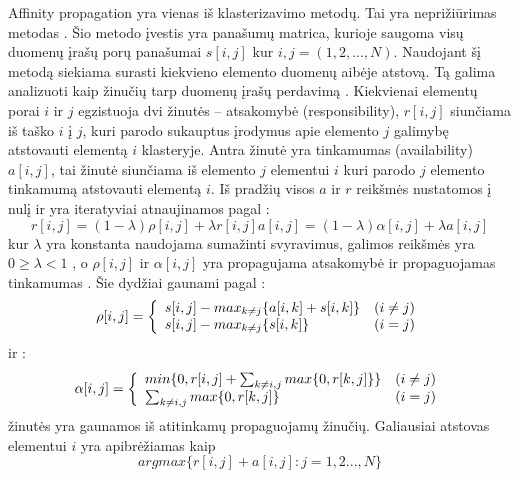 Affinity propagation yra vienas iš klasterizavimo metodų. Tai yra neprižiūrimas metodas \cite{comp}. Šio metodo įvestis yra panašumų matrica, kurioje saugoma visų duomenų įrašų porų panašumai $s[i, j]$ kur $i, j =  (1,  2, ..., N)$. Naudojant šį metodą siekiama surasti kiekvieno elemento duomenų aibėje atstovą. Tą galima analizuoti kaip žinučių tarp duomenų įrašų perdavimą \cite{fastprop}. Kiekvienai elementų porai $i$ ir $j$ egzistuoja dvi žinutės -- atsakomybė (responsibility), $r[i, j]$ siunčiama iš taško $i$ į $j$, kuri parodo sukauptus įrodymus apie elemento $j$ galimybę atstovauti elementą $i$ klasteryje.  Antra žinutė yra tinkamumas (availability) $a[i, j]$, tai žinutė siunčiama iš elemento $j$ elementui $i$ kuri parodo $j$ elemento tinkamumą atstovauti elementą $i$. Iš pradžių visos $a$ ir $r$ reikšmės nustatomos į nulį ir yra iteratyviai atnaujinamos pagal \cite{fastprop}:
 \begin{equation}
    r[i, j] = (1 - \lambda)\rho[i, j] + \lambda r[i, j]
    a[i, j] = (1 - \lambda)\alpha[i, j] + \lambda a[i, j]
 \end{equation}
 kur $\lambda$ yra konstanta naudojama sumažinti svyravimus, galimos reikšmės yra $ 0 \geq \lambda < 1 $ , o $\rho[i, j]$ ir  $\alpha[i, j]$ yra propagujama atsakomybė ir propaguojamas tinkamumas \cite{fastprop}. Šie dydžiai gaunami pagal \cite{fastprop}:
 \begin{equation}
   \rho[i, j]=\left\{
                  \begin{array}{l r}
                    s[i,j] - max_{k \neq j} \{ {a[i, k] + s[i, k]} \} & (i \neq j) \\
                    s[i,j] - max_{k \neq j} \{ {s[i, k]} \} & (i = j) \\
                  \end{array}
                \right.
 \end{equation}
   ir \cite{fastprop}:
\begin{equation}
    \alpha[i, j] =  \left\{
         \begin{array}{l r}
            min \{ 0, r[i, j] + \sum_{k \neq i,j} max \{ 0, r[k, j] \} \}         & (i \neq j) \\
            \sum_{k \neq i,j} max \{ 0, r[k, j] \}  & (i = j) \\
         \end{array}
       \right.
\end{equation}
žinutės yra gaunamos iš atitinkamų propaguojamų žinučių. Galiausiai atstovas elementui $i$ yra apibrėžiamas kaip \cite{fastprop}
\begin{equation}
    argmax \{r[i, j] + a[i, j] : j = 1, 2 ..., N \}
\end{equation}


